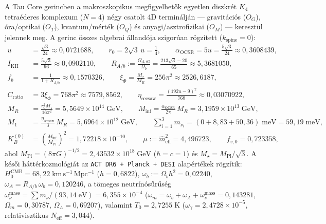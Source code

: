 \documentclass[11pt,a4paper]{article}
\begin{document}
A Tau Core gerincben \cite{Olcsak2026Sub1,Olcsak2026Paper24,Olcsak2026Paper27} a makroszkopikus megfigyelhetők egyetlen diszkrét $K_4$ tetraéderes komplexum ($N = 4$) négy csatolt 4D terminálján — gravitációs ($O_G$), óra/optikai ($O_T$), kvantum/mérték ($O_Q$) és anyagi/asztrofizikai ($O_M$) — keresztül jelennek meg. A gerinc összes algebrai állandója szigorúan rögzített ($k_{\mathrm{spine}} = 0$):
\begin{equation}
\begin{aligned}
  u &= \frac{\sqrt{3}}{24} \approx 0{,}0721688, \qquad r_0 = 2\sqrt{3}\,u = \frac{1}{4}, \qquad \alpha_{\mathrm{OCSR}} = 5u = \frac{5\sqrt{3}}{24} \approx 0{,}3608439, \\
  I_{\mathrm{KH}} &= \frac{5\sqrt{3}}{96} \approx 0{,}0902110, \qquad R_{A/b} := \frac{\Omega_{A,\mathrm{eff}}}{\Omega_b} = \frac{213\sqrt{3} - 20}{65} \approx 5{,}3681050, \\
  f_b &= \frac{1}{1 + R_{A/b}} \approx 0{,}1570326, \qquad \xi_\Phi = \frac{M_\star}{M_R} = 256\pi^2 \approx 2526{,}6187, \\
  C_{\mathrm{ratio}} &= 3\xi_\Phi = 768\pi^2 \approx 7579{,}8562, \qquad \eta_{\mathrm{seesaw}} = \frac{(192u - 9)^2}{768} \approx 0{,}03070922, \\
  M_R &= \frac{r_0^2 M_\star}{16\pi^2} = 5{,}5649\times 10^{14}\;\mathrm{GeV}, \qquad M_{\mathrm{inf}} = \frac{\alpha_{\mathrm{OCSR}}}{2\pi}\,M_R = 3{,}1959\times 10^{13}\;\mathrm{GeV}, \\
  M_1 &= \frac{\eta_{\mathrm{seesaw}}}{3}\,M_R = 5{,}6964\times 10^{12}\;\mathrm{GeV}, \qquad \sum_{i=1}^3 m_{\nu_i} = (0 + 8{,}83 + 50{,}36)\;\mathrm{meV} = 59{,}19\;\mathrm{meV}, \\
  K_B^{(0)} &= \left(\frac{M_{\mathrm{inf}}}{M_{\mathrm{Pl}}}\right)^{\!2} = 1{,}72218\times 10^{-10}, \qquad \mu := \hat{m}_{\mathrm{eff}}^2 = 4{,}496723, \qquad f_{v,0} = 0{,}723358,
\end{aligned}
\label{eq:locked-dictionary}
\end{equation}
ahol $M_{\mathrm{Pl}} = (8\pi G)^{-1/2} = 2{,}43532\times 10^{18}\;\mathrm{GeV}$ ($\hbar = c = 1$) és $M_\star = M_{\mathrm{Pl}}/\sqrt{3}$. A késői háttérkozmológiát az \texttt{ACT DR6 + Planck + DESI} alapértékek rögzítik: $H_0^{\mathrm{CMB}} = 68{,}22\;\mathrm{km\,s^{-1}\,Mpc^{-1}}$ ($h = 0{,}6822$), $\omega_b := \Omega_b h^2 = 0{,}02240$, $\omega_A = R_{A/b}\,\omega_b = 0{,}120246$, a tömeges neutrínósűrűség $\omega_\nu^{\mathrm{mass}} = \sum m_\nu / (93{,}14\;\mathrm{eV}) = 6{,}355\times 10^{-4}$ ($\omega_m = \omega_b + \omega_A + \omega_\nu^{\mathrm{mass}} = 0{,}143281$, $\Omega_m = 0{,}30787$, $\Omega_\Lambda = 0{,}69207$), valamint $T_0 = 2{,}7255\;\mathrm{K}$ ($\omega_\gamma = 2{,}4728\times 10^{-5}$, relativisztikus $N_{\mathrm{eff}} = 3{,}044$).
\end{document}
